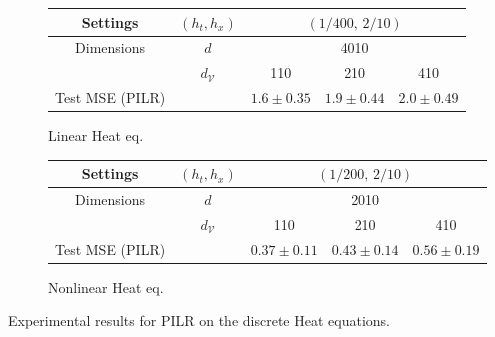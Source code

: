 \documentclass{article}
\theoremstyle{plain}
\theoremstyle{definition}
\theoremstyle{remark}
\begin{document}
\begin{figure}[!htb]
  \centering
  \captionsetup[subfigure]{justification=centering}
  \begin{subfigure}[t]{\textwidth}
    \centering
    \caption{Linear Heat eq.}
    \begin{tabular}{cc|ccc}
      \toprule
      Settings & $(h_t,h_x)$ & \multicolumn{3}{c}{$(1/400,\,2/10)$} \\
      \midrule
      \multirow{2}{*}{Dimensions}  & $d$                & \multicolumn{3}{c}{4010}      \\
                                   & $d_{\mathcal{V}}$  & 110 & 210 & 410 \\
      \midrule
      Test MSE (PILR)             &                    & $1.6 \pm 0.35$ & $1.9 \pm 0.44$ & $2.0 \pm 0.49$ \\
      \bottomrule
    \end{tabular}
  \end{subfigure}

  \vspace{1em}

  \begin{subfigure}[t]{\textwidth}
    \centering
    \caption{Nonlinear Heat eq.}
    \begin{tabular}{cc|ccc}
      \toprule
      Settings & $(h_t,h_x)$ & \multicolumn{3}{c}{$(1/200,\, 2/10)$} \\
      \midrule
      \multirow{2}{*}{Dimensions}  & $d$                & \multicolumn{3}{c}{2010}      \\
                                   & $d_{\mathcal{V}}$  & 110 & 210 & 410 \\
      \midrule
      Test MSE (PILR)             &                    & $0.37 \pm 0.11$ & $0.43 \pm 0.14$ & $0.56 \pm 0.19$ \\
      \bottomrule
    \end{tabular}
  \end{subfigure}

  \caption{Experimental results for PILR on the discrete Heat equations.}
  \label{fig:heat-pilr-sub}
\end{figure}
\end{document}
